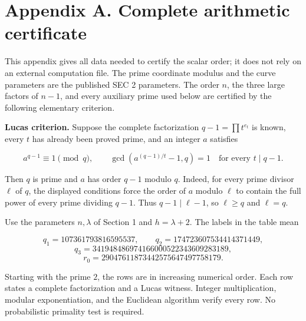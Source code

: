 \documentclass[
  11pt,
  a4paper,
]{article}
\begin{document}
\section{Appendix A. Complete arithmetic
certificate}\label{appendix-a.-complete-arithmetic-certificate}

This appendix gives all data needed to certify the scalar order; it does
not rely on an external computation file. The prime coordinate modulus
and the curve parameters are the published SEC 2 parameters. The order
\(n\), the three large factors of \(n-1\), and every auxiliary prime
used below are certified by the following elementary criterion.

\textbf{Lucas criterion.} Suppose the complete factorization
\(q-1=\prod t^{e_t}\) is known, every \(t\) has already been proved
prime, and an integer \(a\) satisfies

\[
a^{q-1}\equiv1\pmod q,\qquad
\gcd(a^{(q-1)/t}-1,q)=1\quad\text{for every }t\mid q-1.
\]

Then \(q\) is prime and \(a\) has order \(q-1\) modulo \(q\). Indeed,
for every prime divisor \(\ell\) of \(q\), the displayed conditions
force the order of \(a\) modulo \(\ell\) to contain the full power of
every prime dividing \(q-1\). Thus \(q-1\mid\ell-1\), so \(\ell\geq q\)
and \(\ell=q\).

Use the parameters \(n,\lambda\) of Section 1 and \(h=\lambda+2\). The
labels in the table mean

\[
q_1=107361793816595537,\qquad q_2=174723607534414371449,
\] \[
q_3=341948486974166000522343609283189,
\] \[
r_0=29047611873442575647497758179.
\]

Starting with the prime \(2\), the rows are in increasing numerical
order. Each row states a complete factorization and a Lucas witness.
Integer multiplication, modular exponentiation, and the Euclidean
algorithm verify every row. No probabilistic primality test is required.
\end{document}

